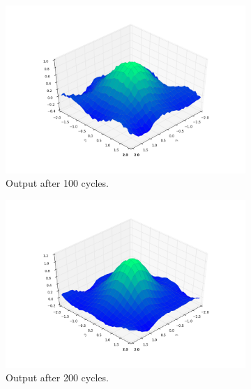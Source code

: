 \documentclass[a4paper,10pt]{article}
\numberwithin{equation}{section} %
\numberwithin{figure}{section} %
\numberwithin{table}{section} %
\theoremstyle{mytheor}
\begin{document}
\begin{enumerate}
\begin{figure}[h!]
\begin{subfigure}[b]{0.45\textwidth}
				\includegraphics[width=\textwidth]{ex2_4llr_100.png}\vspace{-0.5cm}
				\caption{Output after 100 cycles.}
			\end{subfigure}
			\begin{subfigure}[b]{0.45\textwidth}
				\includegraphics[width=\textwidth]{ex2_4llr_200.png}\vspace{-0.5cm}
				\caption{Output after 200 cycles.}
			\end{subfigure}
			\begin{subfigure}[b]{0.45\textwidth}

\end{subfigure}
\end{figure}
\end{enumerate}
\end{document}

